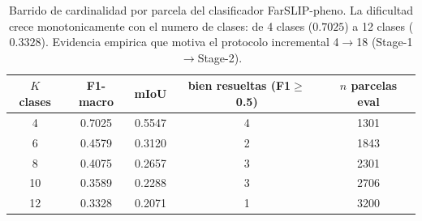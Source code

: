 \begin{table}[htbp]
\caption{Barrido de cardinalidad por parcela del clasificador FarSLIP-pheno.
La dificultad crece monotonicamente con el numero de clases: de 4 clases
($0.7025$) a 12 clases ($0.3328$). Evidencia empirica que motiva el protocolo
incremental 4$\rightarrow$18 (Stage-1$\rightarrow$Stage-2).}
\label{tab:cardinality_sweep}
\centering
\begin{tabular}{ccccc}
\toprule
\textbf{$K$ clases} & \textbf{F1-macro} & \textbf{mIoU} & \textbf{bien resueltas (F1$\geq$0.5)} & \textbf{$n$ parcelas eval} \\
\midrule
 4 & 0.7025 & 0.5547 & 4 & 1301 \\
 6 & 0.4579 & 0.3120 & 2 & 1843 \\
 8 & 0.4075 & 0.2657 & 3 & 2301 \\
10 & 0.3589 & 0.2288 & 3 & 2706 \\
12 & 0.3328 & 0.2071 & 1 & 3200 \\
\bottomrule
\end{tabular}
\end{table}
